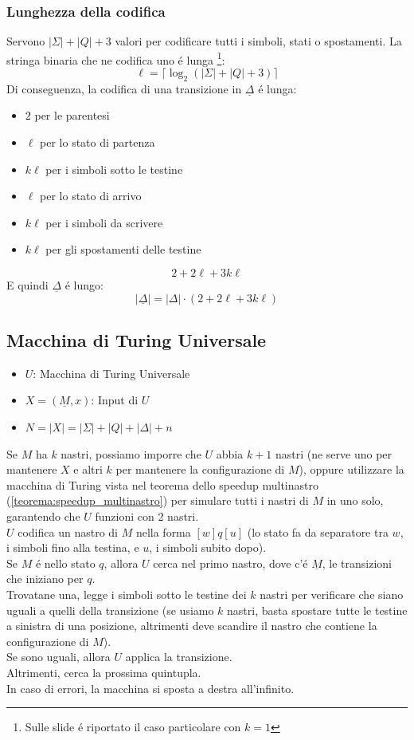 \subsubsection{Lunghezza della codifica}
Servono $|\Sigma| + |Q| + 3$ valori per codificare tutti i simboli, stati o spostamenti. 
La stringa binaria che ne codifica uno é lunga \footnote{Sulle slide é riportato il caso particolare con $k = 1$}:
\[\ell = \lceil \log_2(|\Sigma| + |Q| + 3) \rceil\]
Di conseguenza, la codifica di una transizione in $\underline{\Delta}$ é lunga:
\begin{itemize}
    \item $2$ per le parentesi
    \item $\ell$ per lo stato di partenza
    \item $k \ell$ per i simboli sotto le testine
    \item $\ell$ per lo stato di arrivo
    \item $k \ell$ per i simboli da scrivere
    \item $k \ell$ per gli spostamenti delle testine
\end{itemize}
\[2 + 2\ell + 3k \ell\]
E quindi $\underline{\Delta}$ é lungo:
\[|\underline{\Delta}| = |\Delta| \cdot (2 + 2\ell + 3k \ell)\]

\subsection{Macchina di Turing Universale}
\begin{itemize}
    \item $U$: Macchina di Turing Universale
    \item $X = (\underline{M}, x)$: Input di $U$
    \item $N = |X| = |\Sigma| + |Q| + |\Delta| + n $
\end{itemize}
Se $M$ ha $k$ nastri, possiamo imporre che $U$ abbia $k+1$ nastri (ne serve uno per mantenere $X$ e altri $k$ per mantenere la configurazione di $M$), 
oppure utilizzare la macchina di Turing vista nel teorema dello speedup multinastro (\ref{teorema:speedup_multinastro}) 
per simulare tutti i nastri di $M$ in uno solo, garantendo che $U$ funzioni con 2 nastri. \\

$U$ codifica un nastro di $M$ nella forma $[w]q[u]$ (lo stato fa da separatore tra $w$, i simboli fino alla testina, e $u$, i simboli subito dopo). \\
Se $M$ é nello stato $q$, allora $U$ cerca nel primo nastro, dove c'é $\underline{M}$, le transizioni che iniziano per $q$. \\
Trovatane una, legge i simboli sotto le testine dei $k$ nastri per verificare che siano uguali a quelli della transizione 
(se usiamo $k$ nastri, basta spostare tutte le testine a sinistra di una posizione, altrimenti deve scandire il nastro che contiene la configurazione di $M$). \\
Se sono uguali, allora $U$ applica la transizione. \\
Altrimenti, cerca la prossima quintupla. \\
In caso di errori, la macchina si sposta a destra all'infinito. \\

